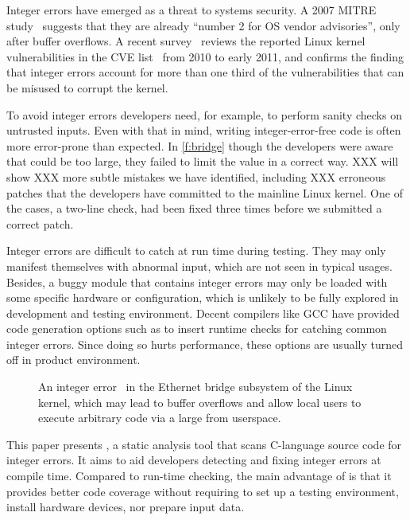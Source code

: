 Integer errors have emerged as a threat to systems security.  A
2007 MITRE study~\cite{christey:vuln} suggests that they are already
``number 2 for OS vendor advisories'', only after buffer overflows.
A recent survey~\cite{chen:kbugs} reviews the reported Linux kernel
vulnerabilities in the CVE list~\cite{cve} from 2010 to early 2011,
and confirms the finding that integer errors account for more than
one third of the vulnerabilities that can be misused to corrupt the
kernel.

To avoid integer errors developers need, for example, to perform
sanity checks on untrusted inputs.  Even with that in mind, writing
integer-error-free code is often more error-prone than expected.
In \autoref{f:bridge} though the developers were aware that 
could be too large, they failed to limit the value in a correct
way.  XXX will show XXX more subtle mistakes we have identified,
including XXX erroneous patches that the developers have committed
to the mainline Linux kernel.  One of the cases, a two-line check,
had been fixed three times before we submitted a correct patch.

Integer errors are difficult to catch at run time during testing.
They may only manifest themselves with abnormal input, which are
not seen in typical usages.  Besides, a buggy module that contains
integer errors may only be loaded with some specific hardware or
configuration, which is unlikely to be fully explored in development
and testing environment.  Decent compilers like GCC have provided
code generation options such as  to insert runtime
checks for catching common integer errors.  Since doing so hurts
performance, these options are usually turned off in product
environment.
\fi

\begin{figure}[t]
\centering

\vspace{-1em}
\caption{An integer error~\cite[CVE-2006-5751]{cve} in the Ethernet
bridge subsystem of the Linux kernel, which may lead to buffer
overflows and allow local users to execute arbitrary code via a
large  from userspace.}
\label{f:bridge}
\end{figure}

This paper presents \sys, a static analysis tool that scans C-language
source code for integer errors.  It aims to aid developers detecting
and fixing integer errors at compile time.  Compared to run-time
checking, the main advantage of \sys is that it provides better
code coverage without requiring to set up a testing environment,
install hardware devices, nor prepare input data.

